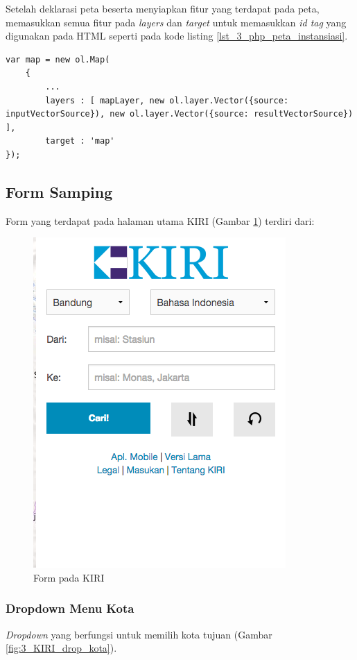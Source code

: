 Setelah deklarasi peta beserta menyiapkan fitur yang terdapat pada peta, memasukkan semua fitur pada \textit{layers} dan \textit{target} untuk memasukkan \textit{id tag} yang digunakan pada HTML seperti pada kode listing \ref{lst_3_php_peta_instansiasi}.

\begin{lstlisting}[caption=Menentukan target tampilan peta,label = {lst_3_php_peta_instansiasi}]
var map = new ol.Map(
	{
		...
		layers : [ mapLayer, new ol.layer.Vector({source: inputVectorSource}), new ol.layer.Vector({source: resultVectorSource}) ],
		target : 'map'
});
\end{lstlisting}

\subsection{Form Samping}
Form yang terdapat pada halaman utama KIRI (Gambar \ref{fig:3_KIRI_form}) terdiri dari:
\begin{figure}[H]
	\centering
	\includegraphics[scale=0.5]{Gambar/KIRI-form}
	\caption{Form pada KIRI} 
	\label{fig:3_KIRI_form}
\end{figure}

\subsubsection{Dropdown Menu Kota}
\textit{Dropdown} yang berfungsi untuk memilih kota tujuan (Gambar \ref{fig:3_KIRI_drop_kota}).

